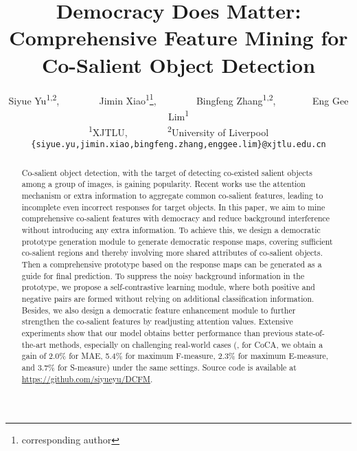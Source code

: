 \documentclass[10pt,twocolumn,letterpaper]{article}
\begin{document}
\title{Democracy Does Matter: Comprehensive Feature Mining for Co-Salient Object Detection}


\author{Siyue Yu\textsuperscript{1,2}, ~~~~~~~ Jimin Xiao\textsuperscript{1}\thanks{corresponding author}, ~~~~~~~ Bingfeng Zhang\textsuperscript{1,2}, ~~~~~~~Eng Gee Lim\textsuperscript{1} \\
{\textsuperscript{1}XJTLU, ~~~~~~~} {\textsuperscript{2}University of Liverpool}\\
{\tt\small \{siyue.yu,jimin.xiao,bingfeng.zhang,enggee.lim\}@xjtlu.edu.cn}
}


\maketitle
\begin{abstract}
Co-salient object detection, with the target of detecting co-existed salient objects among a group of images, is gaining popularity. Recent works use the attention mechanism or extra information to aggregate common co-salient features, leading to incomplete even incorrect responses for target objects.
In this paper, we aim to mine comprehensive co-salient features with democracy and reduce background interference without introducing any extra information.
To achieve this, we design a democratic prototype generation module to generate democratic response maps, covering sufficient co-salient regions and thereby involving more shared attributes of co-salient objects. Then a comprehensive prototype based on the response maps can be generated as a guide for final prediction. 
To suppress the noisy background information in the prototype, we propose a self-contrastive learning module, where both positive and negative pairs are formed without relying on additional classification information.
Besides, we also design a democratic feature enhancement module to further strengthen the co-salient features by readjusting attention values.
Extensive experiments show that our model obtains better performance than previous state-of-the-art methods, especially on challenging real-world cases (\eg, for CoCA, we obtain a gain of 2.0\% for MAE, 5.4\% for maximum F-measure, 2.3\% for maximum E-measure, and 3.7\% for S-measure) under the same settings. Source code is available at \url{https://github.com/siyueyu/DCFM}.
\end{abstract}
\end{document}
